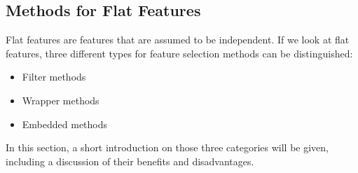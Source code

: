 \subsection{Methods for Flat Features}
\label{sec:methods.flat}


Flat features are features that are assumed to be independent.
If we look at flat features, three different types for feature
selection methods can be distinguished:

\begin{itemize}
  \item Filter methods
  \item Wrapper methods
  \item Embedded methods
\end{itemize}

In this section, a short introduction on those three categories will be given, 
including a discussion of their benefits and disadvantages.



